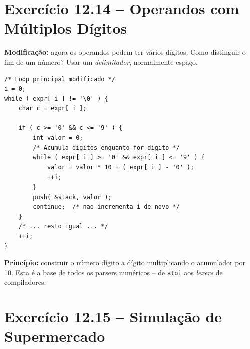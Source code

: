 \documentclass[12pt,a4paper]{article}
\begin{document}
\section{Exercício 12.14 -- Operandos com Múltiplos Dígitos}

\begin{respostabox}
\textbf{Modificação:} agora os operandos podem ter vários dígitos. Como
distinguir o fim de um número? Usar um \textit{delimitador}, normalmente espaço.

\begin{lstlisting}
/* Loop principal modificado */
i = 0;
while ( expr[ i ] != '\0' ) {
    char c = expr[ i ];

    if ( c >= '0' && c <= '9' ) {
        int valor = 0;
        /* Acumula digitos enquanto for digito */
        while ( expr[ i ] >= '0' && expr[ i ] <= '9' ) {
            valor = valor * 10 + ( expr[ i ] - '0' );
            ++i;
        }
        push( &stack, valor );
        continue;  /* nao incrementa i de novo */
    }
    /* ... resto igual ... */
    ++i;
}
\end{lstlisting}

\textbf{Princípio:} construir o número dígito a dígito multiplicando o acumulador
por 10. Esta é a base de todos os parsers numéricos -- de \texttt{atoi} aos
\textit{lexers} de compiladores.
\end{respostabox}

\newpage

\section{Exercício 12.15 -- Simulação de Supermercado}
\end{document}
